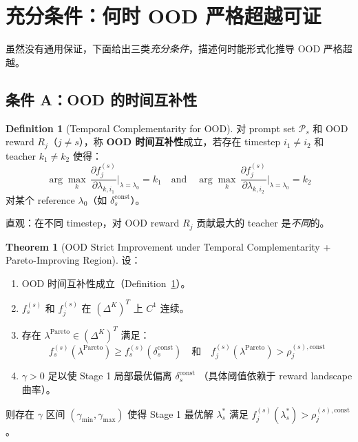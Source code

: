 \documentclass[11pt,a4paper]{article}
\newcommand{\const}{\mathrm{const}}
\theoremstyle{definition}
\newtheorem{definition}{Definition}
\newtheorem{theorem}{Theorem}
\begin{document}
\section{充分条件：何时 OOD 严格超越可证}
\label{sec:sufficient}

虽然没有通用保证，下面给出三类\emph{充分条件}，描述何时能形式化推导
OOD 严格超越。

\subsection{条件 A：OOD 的时间互补性}

\begin{definition}[Temporal Complementarity for OOD]
\label{def:tc_ood}
对 prompt set $\mathcal{P}_s$ 和 OOD reward $R_j$（$j \neq s$），称
\textbf{OOD 时间互补性}成立，若存在 timestep $i_1 \neq i_2$ 和 teacher
$k_1 \neq k_2$ 使得：
\begin{equation}
\arg\max_k\, \frac{\partial f_j^{(s)}}{\partial \lambda_{k, i_1}}
\bigg|_{\lambda = \lambda_0} = k_1
\quad\text{and}\quad
\arg\max_k\, \frac{\partial f_j^{(s)}}{\partial \lambda_{k, i_2}}
\bigg|_{\lambda = \lambda_0} = k_2
\label{eq:tc_ood}
\end{equation}
对某个 reference $\lambda_0$（如 $\delta_s^\const$）。
\end{definition}

直观：在不同 timestep，对 OOD reward $R_j$ 贡献最大的 teacher 是\emph{不同}的。

\begin{theorem}[OOD Strict Improvement under Temporal Complementarity + Pareto-Improving Region]
\label{thm:tc_strict}
设：
\begin{enumerate}[leftmargin=1.5em]
\item[(A1)] OOD 时间互补性成立（Definition~\ref{def:tc_ood}）。
\item[(A2)] $f_s^{(s)}$ 和 $f_j^{(s)}$ 在 $(\Delta^K)^T$ 上 $C^1$ 连续。
\item[(A3)] 存在 $\lambda^{\text{Pareto}} \in (\Delta^K)^T$ 满足：
\begin{equation}
f_s^{(s)}(\lambda^{\text{Pareto}}) \geq f_s^{(s)}(\delta_s^\const) \quad\text{和}\quad
f_j^{(s)}(\lambda^{\text{Pareto}}) > \rho_j^{(s),\const}
\label{eq:pareto_region}
\end{equation}
\item[(A4)] $\gamma > 0$ 足以使 Stage 1 局部最优偏离 $\delta_s^\const$
（具体阈值依赖于 reward landscape 曲率）。
\end{enumerate}
则存在 $\gamma$ 区间 $(\gamma_{\min}, \gamma_{\max})$ 使得 Stage 1 最优解
$\lambda_s^*$ 满足 $f_j^{(s)}(\lambda_s^*) > \rho_j^{(s),\const}$。
\end{theorem}
\end{document}
